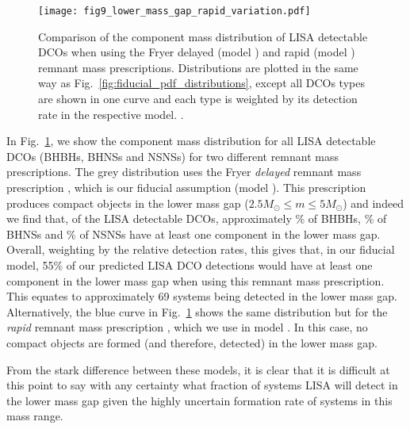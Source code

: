 \begin{figure}[tb]
    \centering
    \texttt{[image: fig9\_lower\_mass\_gap\_rapid\_variation.pdf]}
    \caption{Comparison of the component mass distribution of LISA detectable DCOs when using the Fryer delayed (model \modFid{}) and rapid (model \modRapid{}) remnant mass prescriptions. Distributions are plotted in the same way as Fig.~\ref{fig:fiducial_pdf_distributions}, except all DCOs types are shown in one curve and each type is weighted by its detection rate in the respective model. \href{https://github.com/TomWagg/detecting-DCOs-in-LISA/blob/main/paper/figures/fig9_lower_mass_gap_rapid_variation.pdf}{\faFileImage} \href{https://github.com/TomWagg/detecting-DCOs-in-LISA/blob/main/paper/figure_notebooks/variations.ipynb}{\faBook}.}
    \label{fig:lower_mass_gap_variation}
\end{figure}

In Fig.~\ref{fig:lower_mass_gap_variation}, we show the component mass distribution for all LISA detectable DCOs (BHBHs, BHNSs and NSNSs) for two different remnant mass prescriptions. The grey distribution uses the Fryer \textit{delayed} remnant mass prescription \citep{Fryer+2012}, which is our fiducial assumption (model \modFid{}). This prescription produces compact objects in the lower mass gap ($2.5 \unit{M_{\odot}} \le m \le 5 \unit{M_{\odot}}$) and indeed we find that, of the LISA detectable DCOs, approximately \BHBHatLeastOneLowerMassGapPerc{}\% of BHBHs, \BHNSatLeastOneLowerMassGapPerc{}\% of BHNSs and \NSNSatLeastOneLowerMassGapPerc{}\% of NSNSs have at least one component in the lower mass gap. Overall, weighting by the relative detection rates, this gives that, in our fiducial model, 55\% of our predicted LISA DCO detections would have at least one component in the lower mass gap when using this remnant mass prescription. This equates to approximately 69 systems being detected in the lower mass gap. Alternatively, the blue curve in Fig.~\ref{fig:lower_mass_gap_variation} shows the same distribution but for the \textit{rapid} remnant mass prescription \citep{Fryer+2012}, which we use in model \modRapid{}. In this case, no compact objects are formed (and therefore, detected) in the lower mass gap.

From the stark difference between these models, it is clear that it is difficult at this point to say with any certainty what fraction of systems LISA will detect in the lower mass gap given the highly uncertain formation rate of systems in this mass range.

